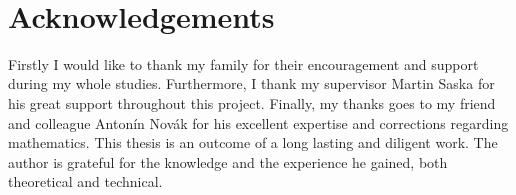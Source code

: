 ~\vfill{}

\section*{Acknowledgements}

Firstly I would like to thank my family for their encouragement and support during my whole studies. Furthermore, I thank my supervisor Martin Saska for his great support throughout this project. Finally, my thanks goes to my friend and colleague Antonín Novák for his excellent expertise and corrections regarding mathematics. This thesis is an outcome of a long lasting and diligent work. The author is grateful for the knowledge and the experience he gained, both theoretical and technical.

\vspace{2.5cm}

\newpage{}
